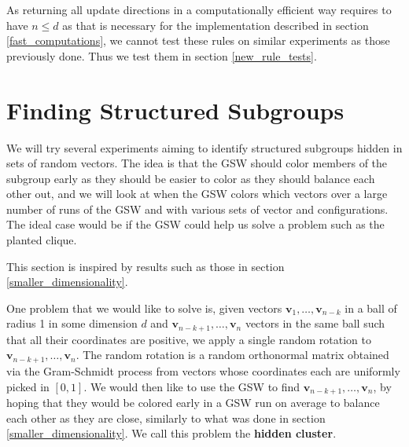 \documentclass[12pt]{article}
\begin{document}
As returning all update directions in a computationally efficient way requires to have $n\leq d$ as that is necessary for the implementation described in section \ref{fast_computations}, we cannot test these rules on similar experiments as those previously done. Thus we test them in section \ref{new_rule_tests}.

\section{Finding Structured Subgroups}\label{structured_subgroups}
We will try several experiments aiming to identify structured subgroups hidden in sets of random vectors. The idea is that the GSW should color members of the subgroup early as they should be easier to color as they should balance each other out, and we will look at when the GSW colors which vectors over a large number of runs of the GSW and with various sets of vector and configurations. The ideal case would be if the GSW could help us solve a problem such as the planted clique.

This section is inspired by results such as those in section \ref{smaller_dimensionality}.

One problem that we would like to solve is, given vectors $\textbf{v}_1,\dots,\textbf{v}_{n-k}$ in a ball of radius 1 in some dimension $d$ and $\textbf{v}_{n-k+1},\dots,\textbf{v}_n$ vectors in the same ball such that all their coordinates are positive, we apply a single random rotation to $\textbf{v}_{n-k+1},\dots,\textbf{v}_n$. The random rotation is a random orthonormal matrix obtained via the Gram-Schmidt process from vectors whose coordinates each are uniformly picked in $[0,1]$. We would then like to use the GSW to find $\textbf{v}_{n-k+1},\dots,\textbf{v}_n$, by hoping that they would be colored early in a GSW run on average to balance each other as they are close, similarly to what was done in section \ref{smaller_dimensionality}. We call this problem the \textbf{hidden cluster}.
\end{document}
